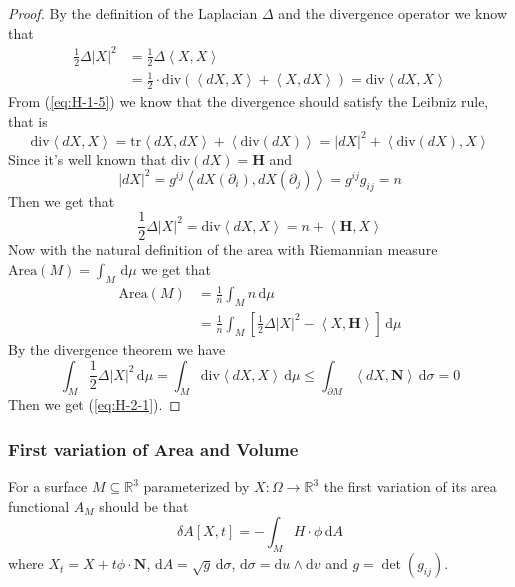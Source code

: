 \begin{proof}
    By the definition of the Laplacian $\Delta$ and the divergence operator we know that
    \begin{align*}
        \frac{1}{2}\Delta {\left|X\right|}^2&=\frac{1}{2}\Delta\left<X,X\right>\\
        &=\frac{1}{2}\cdot\mathrm{div}\left(\left<dX,X\right>+\left<X,dX\right>\right)=\mathrm{div}\left<dX,X\right>
    \end{align*}
    From (\ref{eq:H-1-5}) we know that the divergence should satisfy the Leibniz rule, that is
    \begin{equation*}
        \mathrm{div}\left<dX,X\right>=\mathrm{tr}\left<dX,dX\right>+\left<\mathrm{div}\left(dX\right)\right>={\left|dX\right|}^2+\left<\mathrm{div}\left(dX\right),X\right>
    \end{equation*}
    Since it's well known that $\mathrm{div} (dX)=\boldsymbol{H}$ and
    \begin{equation*}
        {\left|dX\right|}^2=g^{ij}\left<dX(\partial_i),dX(\partial_j)\right>=g^{ij}g_{ij}=n
    \end{equation*}
    Then we get that
    \begin{equation*}
        \frac{1}{2}\Delta {\left|X\right|}^2=\mathrm{div}\left<dX,X\right>=n+\left<\boldsymbol{H},X\right>
    \end{equation*}
    Now with the natural definition of the area with Riemannian measure $\mathrm{Area}(M)=\int_M\,\mathrm{d}\mu$ we get that
    \begin{align*}
        \mathrm{Area}(M)&=\frac{1}{n}\int_M n\,\mathrm{d}\mu\\
        &=\frac{1}{n}\int_M \left[\frac{1}{2}\Delta{\left|X\right|}^2-\left<X,\boldsymbol{H}\right>\right]\,\mathrm{d}\mu
    \end{align*}
    By the divergence theorem we have
    \begin{equation*}
        \int_M\frac{1}{2}\Delta {\left|X\right|}^2\,\mathrm{d}\mu=\int_M\mathrm{div}\left<dX,X\right>\,\mathrm{d}\mu\le\int_{\partial M}\left<dX,\mathbf{N}\right>\,\mathrm{d}\sigma=0
    \end{equation*}
    Then we get (\ref{eq:H-2-1}).
\end{proof}

\newpage
\subsubsection{First variation of Area and Volume}
\begin{example}\label{exam:H-F-1}
    For a surface $M\subseteq\mathbb{R}^3$ parameterized by $X:\Omega\to\mathbb{R}^3$ the first variation of its area functional $A_M$ should be that
    \begin{equation}\label{eq:H-F-1}
        \delta A[X,t]=-\int_{M}H\cdot\phi\, \mathrm{d} A
    \end{equation}
    where $X_t=X+t\phi\cdot\mathbf{N}$, $\mathrm{d}A=\sqrt{g}\,\mathrm{d}\sigma$, $\mathrm{d}\sigma=\mathrm{d}u\wedge\mathrm{d}v$ and $g=\det{(g_{ij})}$.
\end{example}

